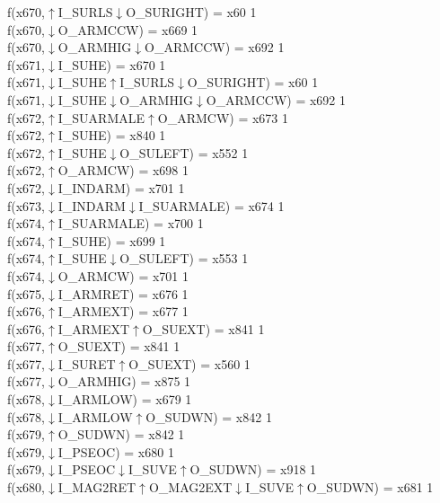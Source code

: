 f(x670,$\uparrow$I\_SURLS$\downarrow$O\_SURIGHT) = x60 {1} \\
f(x670,$\downarrow$O\_ARMCCW) = x669 {1} \\
f(x670,$\downarrow$O\_ARMHIG$\downarrow$O\_ARMCCW) = x692 {1} \\
f(x671,$\downarrow$I\_SUHE) = x670 {1} \\
f(x671,$\downarrow$I\_SUHE$\uparrow$I\_SURLS$\downarrow$O\_SURIGHT) = x60 {1} \\
f(x671,$\downarrow$I\_SUHE$\downarrow$O\_ARMHIG$\downarrow$O\_ARMCCW) = x692 {1} \\
f(x672,$\uparrow$I\_SUARMALE$\uparrow$O\_ARMCW) = x673 {1} \\
f(x672,$\uparrow$I\_SUHE) = x840 {1} \\
f(x672,$\uparrow$I\_SUHE$\downarrow$O\_SULEFT) = x552 {1} \\
f(x672,$\uparrow$O\_ARMCW) = x698 {1} \\
f(x672,$\downarrow$I\_INDARM) = x701 {1} \\
f(x673,$\downarrow$I\_INDARM$\downarrow$I\_SUARMALE) = x674 {1} \\
f(x674,$\uparrow$I\_SUARMALE) = x700 {1} \\
f(x674,$\uparrow$I\_SUHE) = x699 {1} \\
f(x674,$\uparrow$I\_SUHE$\downarrow$O\_SULEFT) = x553 {1} \\
f(x674,$\downarrow$O\_ARMCW) = x701 {1} \\
f(x675,$\downarrow$I\_ARMRET) = x676 {1} \\
f(x676,$\uparrow$I\_ARMEXT) = x677 {1} \\
f(x676,$\uparrow$I\_ARMEXT$\uparrow$O\_SUEXT) = x841 {1} \\
f(x677,$\uparrow$O\_SUEXT) = x841 {1} \\
f(x677,$\downarrow$I\_SURET$\uparrow$O\_SUEXT) = x560 {1} \\
f(x677,$\downarrow$O\_ARMHIG) = x875 {1} \\
f(x678,$\downarrow$I\_ARMLOW) = x679 {1} \\
f(x678,$\downarrow$I\_ARMLOW$\uparrow$O\_SUDWN) = x842 {1} \\
f(x679,$\uparrow$O\_SUDWN) = x842 {1} \\
f(x679,$\downarrow$I\_PSEOC) = x680 {1} \\
f(x679,$\downarrow$I\_PSEOC$\downarrow$I\_SUVE$\uparrow$O\_SUDWN) = x918 {1} \\
f(x680,$\downarrow$I\_MAG2RET$\uparrow$O\_MAG2EXT$\downarrow$I\_SUVE$\uparrow$O\_SUDWN) = x681 {1} \\
